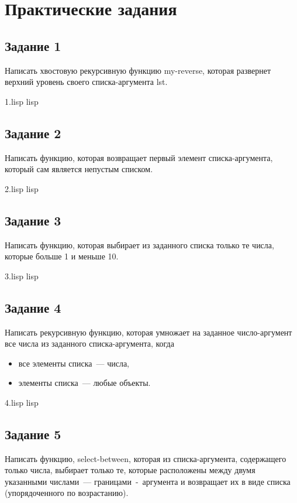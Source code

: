 \chapter{Практические задания}

\section{Задание 1}
Написать хвостовую рекурсивную функцию my-reverse, которая развернет верхний уровень своего списка-аргумента lst.

{1.lisp}
{lisp}
{}


\section{Задание 2}
Написать функцию, которая возвращает первый элемент списка-аргумента, который сам является непустым списком.

{2.lisp}
{lisp}
{}


\section{Задание 3}
Написать функцию, которая выбирает из заданного списка только те числа, которые больше 1 и меньше 10.

{3.lisp}
{lisp}
{}


\section{Задание 4}
Написать рекурсивную функцию, которая умножает на заданное число-аргумент все числа из заданного списка-аргумента, когда
\begin{itemize}
	\item все элементы списка~--- числа,
	\item элементы списка~--- любые объекты.
\end{itemize}

{4.lisp}
{lisp}
{}


\section{Задание 5}
Написать функцию, select-between, которая из списка-аргумента, содержащего только числа, выбирает только те, которые расположены между двумя указанными числами~--- границами~-~аргумента и возвращает их в виде списка (упорядоченного по возрастанию).

